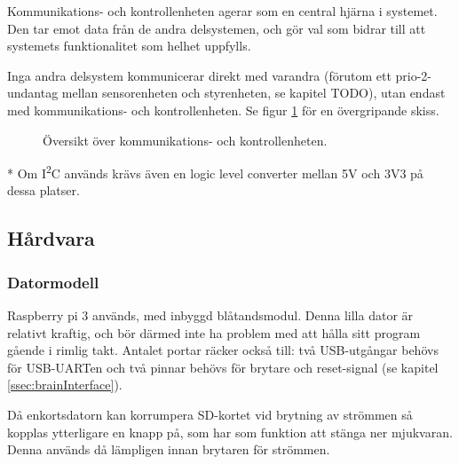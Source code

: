 \documentclass[a4paper,11pt]{article}
\begin{document}

Kommunikations- och kontrollenheten agerar som en central hjärna i systemet. Den tar emot data från de andra delsystemen, och gör val som bidrar till att systemets funktionalitet som helhet uppfylls.

Inga andra delsystem kommunicerar direkt med varandra (förutom ett prio-2-undantag mellan sensorenheten och styrenheten, se kapitel TODO), utan endast med kommunikations- och kontrollenheten. Se figur \ref{fig:unitBrain} för en övergripande skiss.
\begin{figure}[h!]
    \caption{Översikt över kommunikations- och kontrollenheten.  }
    \label{fig:unitBrain}
\end{figure}
\noindent \begin{small}
* Om I\textsuperscript{2}C används krävs även en logic level converter mellan 5V och 3V3 på dessa platser.
\end{small}

\subsection{Hårdvara}

\subsubsection{Datormodell}
Raspberry pi 3 används, med inbyggd blåtandsmodul. Denna lilla dator är relativt kraftig, och bör därmed inte ha problem med att hålla sitt program gående i rimlig takt. Antalet portar räcker också till: två USB-utgångar behövs för USB-UARTen och två pinnar behövs för brytare och reset-signal (se kapitel \ref{ssec:brainInterface}).

Då enkortsdatorn kan korrumpera SD-kortet vid brytning av strömmen så kopplas ytterligare en knapp på, som har som funktion att stänga ner mjukvaran. Denna används då lämpligen innan brytaren för strömmen.
\end{document}
